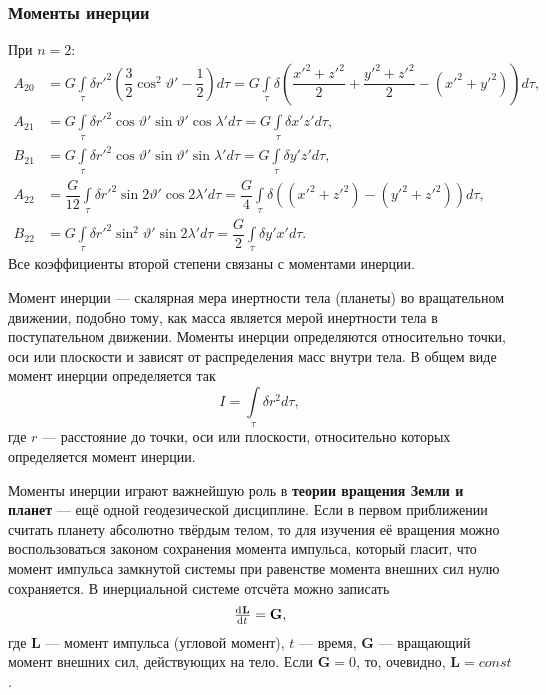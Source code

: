 \documentclass[11pt, a4paper,addpoints]{exam}
\theoremstyle{remark}
\renewcommand{\theta}{\vartheta}
\begin{document}
    \subsubsection*{Моменты инерции}
    При $n = 2$:
    \begin{align*}
        A_{20} &= G \int\limits_\tau \delta r'^2 \left( \dfrac{3}{2}\cos^2{\theta'} - \dfrac{1}{2} \right)d\tau =
        G \int\limits_\tau \delta \left(\dfrac{x'^2 + z'^2}{2} + \dfrac{y'^2 + z'^2}{2} - \left(
        x'^2 + y'^2 \right)\right) d\tau, \\
        A_{21} &= G \int\limits_\tau \delta r'^2 \cos{\theta'}\sin{\theta'} \cos{\lambda'} d\tau =
        G\int\limits_\tau \delta x'z' d\tau, \\
        B_{21} &= G \int\limits_\tau \delta r'^2 \cos{\theta'}\sin{\theta'} \sin{\lambda'} d\tau =
        G\int\limits_\tau \delta y'z' d\tau, \\
        A_{22} &= \dfrac{G}{12} \int\limits_\tau \delta r'^2 \sin{2\theta'} \cos{2\lambda'} d\tau =
        \dfrac{G}{4}\int\limits_\tau \delta \left( \left( x'^2 + z'^2 \right) - 
        \left( y'^2 + z'^2 \right) \right)  d\tau, \\
        B_{22} &= G\int\limits_\tau \delta r'^2 \sin^2{\theta'} \sin{2\lambda'} d\tau =
        \dfrac{G}{2} \int\limits_\tau \delta y'x' d\tau.
    \end{align*}
    Все коэффициенты второй степени связаны с моментами инерции.

    Момент инерции --- скалярная мера инертности тела (планеты) во вращательном движении, подобно тому, как
    масса является мерой инертности тела в поступательном движении. Моменты инерции определяются
    относительно точки, оси или плоскости и зависят от распределения масс внутри тела. В общем виде
    момент инерции определяется так
    \begin{equation*}
        I = \int\limits_{\tau}\delta r^2 d\tau,
    \end{equation*}
    где $r$ --- расстояние до точки, оси или плоскости, относительно которых определяется момент
    инерции.

    Моменты инерции играют важнейшую роль в \textbf{теории вращения Земли и планет} --- ещё
    одной геодезической дисциплине. Если в первом приближении считать планету абсолютно твёрдым
    телом, то для изучения её вращения можно воспользоваться законом сохранения момента
    импульса, который гласит, что момент импульса замкнутой системы при равенстве момента внешних
    сил нулю сохраняется. В инерциальной системе отсчёта можно записать
    \begin{equation*}
        \od{\mathbf{L}}{t} = \mathbf{G},
    \end{equation*}
    где $\mathbf{L}$ --- момент импульса (угловой момент), $t$ --- время, $\mathbf{G}$ --- 
    вращающий момент внешних сил, действующих на тело. Если $\mathbf{G} = 0$, 
    то, очевидно, $\mathbf{L} = const$. 
\end{document}
